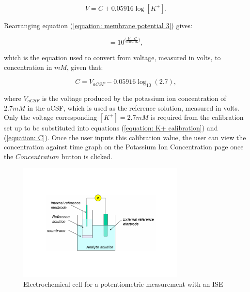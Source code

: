 \begin{equation}
    V = C + 0.05916 \log [K^{+}].
    \label{equation: membrane potential 3}
\end{equation}

\noindent Rearranging equation (\ref{equation: membrane potential 3}) gives:

\begin{equation}
    [K^{+}] = 10^{\big(\frac{V-C}{0.05916}\big)},
    \label{equation: K+ calibration}
\end{equation}

\noindent which is the equation used to convert from voltage, measured in volts, to concentration in $mM$, given that:

\begin{equation}
    C = V_{aCSF} - 0.05916\log_{10} (2.7),
    \label{equation: C}
\end{equation}

\noindent where $V_{aCSF}$ is the voltage produced by the potassium ion concentration of $2.7mM$ in the aCSF, which is used as the reference solution, measured in volts. Only the voltage corresponding $[K^{+}] = 2.7mM$ is required from the calibration set up to be substituted into equations (\ref{equation: K+ calibration}) and (\ref{equation: C}). Once the user inputs this calibration value, the user can view the concentration against time graph on the Potassium Ion Concentration page once the $Concentration$ button is clicked. \newline

\begin{figure}[h!]
\centering
\includegraphics[trim={0cm 5cm 0cm  5cm}, clip, width=0.75\textwidth]{./figures/ISE.pdf}
\captionsetup{justification=centering}
\caption{Electrochemical cell for a potentiometric measurement with an ISE \cite{LibreTexts2019}}
\label{fig: ISE}
\end{figure}


